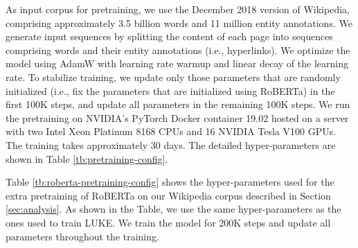 \documentclass[11pt,a4paper]{article}
\begin{document}
\begin{table}[t]
As input corpus for pretraining, we use the December 2018 version of Wikipedia, comprising approximately 3.5 billion words and 11 million entity annotations.
We generate input sequences by splitting the content of each page into sequences comprising  words and their entity annotations (i.e., hyperlinks).
We optimize the model using AdamW with learning rate warmup and linear decay of the learning rate.
To stabilize training, we update only those parameters that are randomly initialized (i.e., fix the parameters that are initialized using RoBERTa) in the first 100K steps, and update all parameters in the remaining 100K steps.
We run the pretraining on NVIDIA's PyTorch Docker container 19.02 hosted on a server with two Intel Xeon Platinum 8168 CPUs and 16 NVIDIA Tesla V100 GPUs.
The training takes approximately 30 days.
The detailed hyper-parameters are shown in Table  \ref{tb:pretraining-config}.

Table \ref{tb:roberta-pretraining-config} shows the hyper-parameters used for the extra pretraining of RoBERTa on our Wikipedia corpus described in Section \ref{sec:analysis}.
As shown in the Table, we use the same hyper-parameters as the ones used to train LUKE.
We train the model for 200K steps and update all parameters throughout the training.

\begin{table}[tb]
    \centering
    \caption{Hyper-parameters used to pretrain LUKE.}
    \label{tb:pretraining-config}
\end{table}


\end{table}
\end{document}
